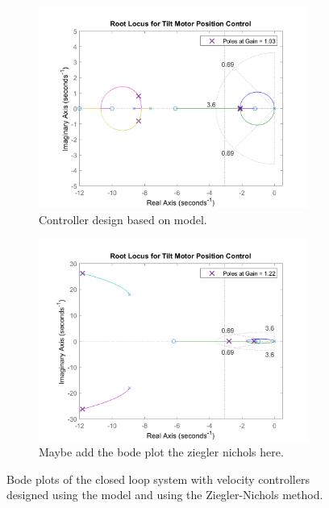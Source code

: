 \documentclass[../../main.tex]{subfiles}
\begin{document}
\begin{figure}[h]
\begin{subfigure}{0.48\textwidth}
    \includegraphics[width = 0.97\textwidth]{Sections/System_Design/Images/RL_cascadePP.png}
    \caption{Controller design based on model.}
    \label{fig:RL_cascade_PP}
\end{subfigure}\quad
\begin{subfigure}{0.48\textwidth}
    \includegraphics[width = 0.97\textwidth]{Sections/System_Design/Images/RL_cascadeNZ.png}
    \caption{Maybe add the bode plot the ziegler nichols here.}
    \label{fig:RL_cascade_NZ}
\end{subfigure}
\caption{Bode plots of the closed loop system with velocity controllers designed using the model and using the Ziegler-Nichols method.}
\label{fig:RL_cascade}
\end{figure}
\end{document}
